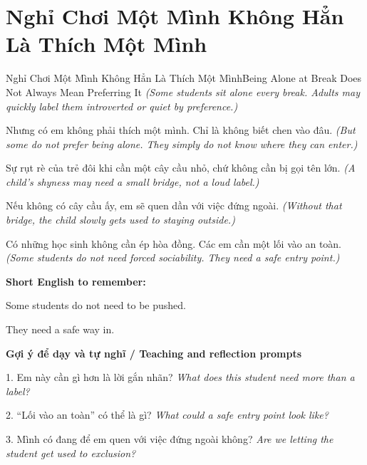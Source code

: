 \section{Nghỉ Chơi Một Mình Không Hẳn Là Thích Một Mình}
\begin{truyen}{Nghỉ Chơi Một Mình Không Hẳn Là Thích Một Mình}{Being Alone at Break Does Not Always Mean Preferring It}
\textit{(Some students sit alone every break. Adults may quickly label them introverted or quiet by preference.)}

Nhưng có em không phải thích một mình. Chỉ là không biết chen vào đâu.
\textit{(But some do not prefer being alone. They simply do not know where they can enter.)}

Sự rụt rè của trẻ đôi khi cần một cây cầu nhỏ, chứ không cần bị gọi tên lớn.
\textit{(A child’s shyness may need a small bridge, not a loud label.)}

Nếu không có cây cầu ấy, em sẽ quen dần với việc đứng ngoài.
\textit{(Without that bridge, the child slowly gets used to staying outside.)}

\end{truyen}

\begin{baihoc}
Có những học sinh không cần ép hòa đồng. Các em cần một lối vào an toàn.
\textit{(Some students do not need forced sociability. They need a safe entry point.)}
\end{baihoc}

\begin{ghinhoanh}
\textbf{Short English to remember:}

Some students do not need to be pushed.

They need a safe way in.

\end{ghinhoanh}

\begin{tuhocnhanh}
\textbf{Gợi ý để dạy và tự nghĩ / Teaching and reflection prompts}

1. Em này cần gì hơn là lời gắn nhãn? \textit{What does this student need more than a label?}

2. “Lối vào an toàn” có thể là gì? \textit{What could a safe entry point look like?}

3. Mình có đang để em quen với việc đứng ngoài không? \textit{Are we letting the student get used to exclusion?}
\end{tuhocnhanh}
\ngancach


